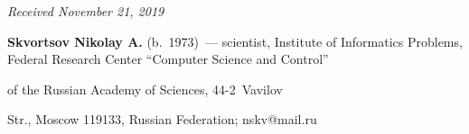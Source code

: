        

        


        

        \hfill{\small\textit{Received November 21, 2019}} 

        


      

      

      \Contrl

      

      \noindent

      \textbf{Skvortsov Nikolay A.} (b.\ 1973)~--- scientist, Institute of Informatics Problems, Federal Research Center ``Computer Science and Control''

       of the Russian Academy of Sciences, 44-2~Vavilov 

      Str., Moscow 119133, Russian Federation; \mbox{nskv@mail.ru}

      

        \label{end\stat}

        

        \renewcommand{\bibname}{\protect\rm Литература}  

      

